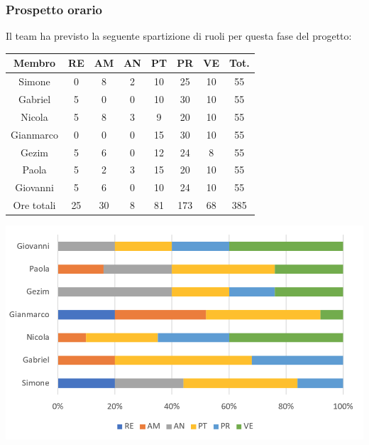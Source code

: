 \subsubsection{Prospetto orario}
Il team ha previsto la seguente spartizione di ruoli per questa fase del progetto:
\\
\begin{center}
\begin{tabular}{ |c|c|c|c|c|c|c|c|  }
 \hline
 Membro 		& RE 	& AM 	& AN 	& PT 	& PR 	& VE 	& Tot.\\
 \hline\hline
 Simone			& 0 		& 8		& 2 	& 10 	& 25 		& 10 		& 55\\
 Gabriel		& 5 		& 0 		& 0 	& 10		& 30 		& 10 		& 55\\
 Nicola			& 5 		& 8 		& 3 	& 9 		& 20 		& 10 		& 55\\
 Gianmarco		& 0 		& 0 		& 0 	& 15 	& 30 		& 10 		& 55\\
 Gezim			& 5 		& 6 		& 0 	& 12 		& 24 		& 8	 	& 55\\
 Paola			& 5 		& 2 		& 3 	& 15 		& 20 		& 10 		& 55\\
 Giovanni		& 5 		& 6	 	& 0 	& 10 		& 24 		& 10  	& 55\\
 \hline\hline
 Ore totali		& 25		& 30		& 8 	& 81	 	& 173 	& 68 	& 385\\
  \hline
\end{tabular}
\end{center}

\includegraphics[width=\textwidth]{res/img/hi33}
\
